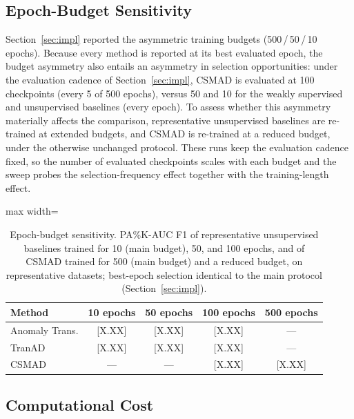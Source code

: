 \subsection{Epoch-Budget Sensitivity}
\label{sec:epoch_sensitivity}

Section~\ref{sec:impl} reported the asymmetric training budgets (500\,/\,50\,/\,10 epochs).
Because every method is reported at its best evaluated epoch, the budget asymmetry also entails
an asymmetry in selection opportunities: under the evaluation cadence of
Section~\ref{sec:impl}, CSMAD is evaluated at 100 checkpoints (every 5 of 500 epochs), versus
50 and 10 for the weakly supervised and unsupervised baselines (every epoch).
To assess whether this asymmetry materially affects the comparison, representative unsupervised
baselines are re-trained at extended budgets, and CSMAD is re-trained at a reduced budget, under
the otherwise unchanged protocol.
These runs keep the evaluation cadence fixed, so the number of evaluated checkpoints scales
with each budget and the sweep probes the selection-frequency effect together with the
training-length effect.

\begin{table}[tp]
\footnotesize
\centering
\caption{Epoch-budget sensitivity. PA\%K-AUC F1 of representative unsupervised baselines
  trained for 10 (main budget), 50, and 100 epochs, and of CSMAD trained for 500 (main budget)
  and a reduced budget, on representative datasets; best-epoch selection identical to the main
  protocol (Section~\ref{sec:impl}).}
\label{tab:epoch_sensitivity}
\begin{adjustbox}{max width=\linewidth}
\begin{tabular}{lcccc}
\toprule
Method & 10 epochs & 50 epochs & 100 epochs & 500 epochs \\
\midrule
Anomaly Trans. & {[X.XX]} & {[X.XX]} & {[X.XX]} & --- \\
TranAD         & {[X.XX]} & {[X.XX]} & {[X.XX]} & --- \\
CSMAD          & --- & --- & {[X.XX]} & {[X.XX]} \\
\bottomrule
\end{tabular}
\end{adjustbox}
\end{table}

\subsection{Computational Cost}
\label{sec:cost}

